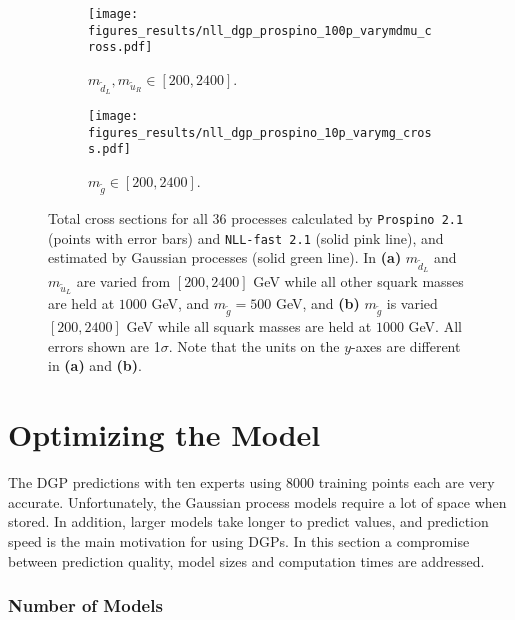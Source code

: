 \documentclass[twoside,english]{uiofysmaster}
\begin{document}
{{\begin{figure}
    \centering
    \begin{subfigure}[b]{0.9\textwidth}
        \texttt{[image: figures\_results/nll\_dgp\_prospino\_100p\_varymdmu\_cross.pdf]}
\caption{$m_{\widetilde{d}_L}, m_{\widetilde{u}_R} \in [200, 2400]$.}
\label{Fig:: results : total prospino dgp vary mdL}
    \end{subfigure}

    \begin{subfigure}[b]{0.9\textwidth}
    \centering
        \texttt{[image: figures\_results/nll\_dgp\_prospino\_10p\_varymg\_cross.pdf]}
\caption{$m_{\widetilde{g}} \in [200, 2400]$.}
\label{Fig:: results : total prospino dgp varymg}
    \end{subfigure}

    \caption[Plots of total estimated cross sections]{Total cross sections for all 36 processes calculated by {\tt Prospino 2.1} (points with error bars) and {\tt NLL-fast 2.1} (solid pink line), and estimated by Gaussian processes (solid green line). In \textbf{(a)} $m_{\widetilde{d}_L}$ and $m_{\widetilde{u}_L}$ are varied from $[200, 2400]$ GeV while all other squark masses are held at $1000$ GeV, and $m_{\widetilde{g}}=500$ GeV, and \textbf{(b)} $m_{\widetilde{g}}$ is varied $[200, 2400]$ GeV while all squark masses are held at $1000$ GeV. All errors shown are 1$\sigma$. Note that the units on the $y$-axes are different in \textbf{(a)} and \textbf{(b)}.}\label{Fig:: results : total cross sections}
\end{figure}





\section{Optimizing the Model}\label{Sec:: results : The Optimal Model}

The DGP predictions with ten experts using 8000 training points each are very accurate. Unfortunately, the Gaussian process models require a lot of space when stored. In addition, larger models take longer to predict values, and prediction speed is the main motivation for using DGPs. In this section a compromise   between prediction quality, model sizes and computation times are addressed.

\subsubsection{Number of Models}

}}
\end{document}
